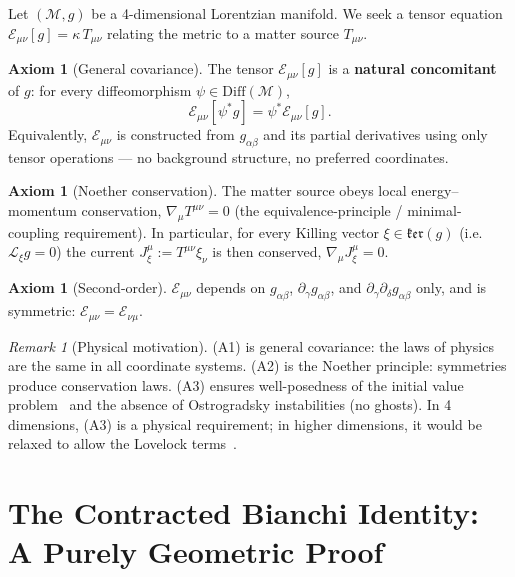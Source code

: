 \documentclass[12pt]{article}
\theoremstyle{plain}
\theoremstyle{definition}
\newtheorem{axiom}[theorem]{Axiom}
\theoremstyle{remark}
\newtheorem{remark}[theorem]{Remark}
\newcommand{\Diff}{\mathrm{Diff}}
\begin{document}
Let $(\mathcal{M}, g)$ be a 4-dimensional Lorentzian manifold. We seek a tensor equation $\mathcal{E}_{\mu\nu}[g] = \kappa\,T_{\mu\nu}$ relating the metric to a matter source $T_{\mu\nu}$.

\begin{axiom}[General covariance]\label{ax:A1}
The tensor $\mathcal{E}_{\mu\nu}[g]$ is a \textbf{natural concomitant} of $g$: for every diffeomorphism $\psi \in \Diff(\mathcal{M})$,
\begin{equation}
\mathcal{E}_{\mu\nu}[\psi^*g] = \psi^*\mathcal{E}_{\mu\nu}[g].
\end{equation}
Equivalently, $\mathcal{E}_{\mu\nu}$ is constructed from $g_{\alpha\beta}$ and its partial derivatives using only tensor operations --- no background structure, no preferred coordinates.
\end{axiom}

\begin{axiom}[Noether conservation]\label{ax:A2}
The matter source obeys local energy--momentum conservation, $\nabla_\mu T^{\mu\nu} = 0$ (the equivalence-principle / minimal-coupling requirement). In particular, for every Killing vector $\xi \in \mathfrak{ker}(g)$ (i.e.\ $\mathcal{L}_\xi g = 0$) the current $J^\mu_\xi := T^{\mu\nu}\xi_\nu$ is then conserved, $\nabla_\mu J^\mu_\xi = 0$.
\end{axiom}

\begin{axiom}[Second-order]\label{ax:A3}
$\mathcal{E}_{\mu\nu}$ depends on $g_{\alpha\beta}$, $\partial_\gamma g_{\alpha\beta}$, and $\partial_\gamma\partial_\delta g_{\alpha\beta}$ only, and is symmetric: $\mathcal{E}_{\mu\nu} = \mathcal{E}_{\nu\mu}$.
\end{axiom}

\begin{remark}[Physical motivation]
(A1) is general covariance: the laws of physics are the same in all coordinate systems. (A2) is the Noether principle: symmetries produce conservation laws. (A3) ensures well-posedness of the initial value problem~\cite{choquetbruhat1952} and the absence of Ostrogradsky instabilities (no ghosts). In 4 dimensions, (A3) is a physical requirement; in higher dimensions, it would be relaxed to allow the Lovelock terms~\cite{lovelock1971}.
\end{remark}


\section{The Contracted Bianchi Identity: A Purely Geometric Proof}
\label{sec:bianchi}
\end{document}
